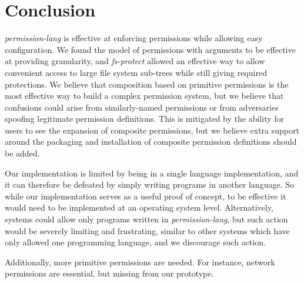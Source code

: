 \section{Conclusion}\label{section:conclusion}
\textit{permission-lang} is effective at enforcing permissions while allowing easy configuration.  We found the model of permissions with arguments to be effective at providing granularity, and \textit{fs-protect} allowed an effective way to allow convenient access to large file system sub-trees while still giving required protections.
We believe that composition based on primitive permissions is the most effective way to build a complex permission system, but we believe that confusions could arise from similarly-named permissions or from adversaries spoofing legitimate permission definitions.  This is mitigated by the ability for users to see the expansion of composite permissions, but we believe extra support around the packaging and installation of composite permission definitions should be added.

Our implementation is limited by being in a single language implementation, and it can therefore be defeated by simply writing programs in another language.  So while our implementation serves as a useful proof of concept, to be effective it would need to be implemented at an operating system level.  Alternatively, systems could allow only programs written in \textit{permission-lang}, but such action would be severely limiting and frustrating, similar to other systems which have only allowed one programming language, and we discourage such action.  

Additionally, more primitive permissions are needed.  For instance, network permissions are essential, but missing from our prototype.




